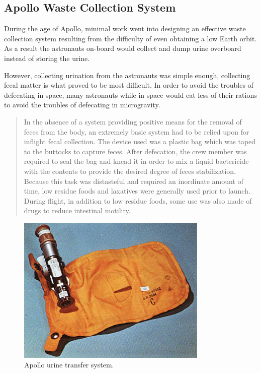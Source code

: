     \subsection{Apollo Waste Collection System}

    During the age of Apollo, minimal work went into designing an effective waste collection system resulting from the difficulty of even obtaining a low Earth orbit. As a result the astronauts on-board would collect and dump urine overboard instead of storing the urine. 

    However, collecting urination from the astronauts was simple enough, collecting fecal matter is what proved to be most difficult. In order to avoid the troubles of defecating in space, many astronauts while in space would eat less of their rations to avoid the troubles of defecating in microgravity.

    \begin{quote}
        In the absence of a system providing positive means for the removal of feces from the body, an extremely basic system had to be relied upon for inflight fecal collection. The device used was a plastic bag which was taped to the buttocks to capture feces. After defecation, the crew member was required to seal the bag and knead it in order to mix a liquid bactericide with the contents to provide the desired degree of feces stabilization. Because this task was distasteful and required an inordinate amount of time, low residue foods and laxatives were generally used prior to launch. During flight, in addition to low residue foods, some use was also made of drugs to reduce intestinal motility.\cite{ref:apollo_bathroom}
    \end{quote}

    \pagebreak

    \begin{figure}[h]
        \centering
        \includegraphics[width = 0.6\linewidth]{figs/apollo_urine_bag.jpg}
        \caption[Apollo Urine Transfer System]{Apollo urine transfer system.}
        \label{fig:apollo_urine_bag}
    \end{figure}

